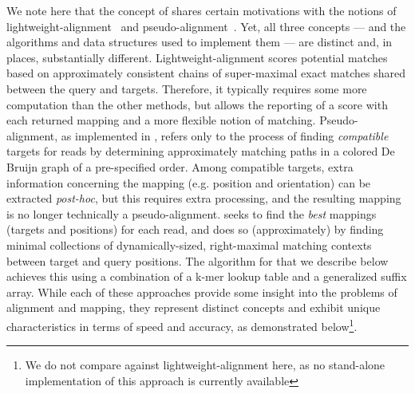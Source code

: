 We note here that the concept of \qm shares certain motivations with the notions of lightweight-alignment~\citep{salmon} and pseudo-alignment~\citep{kallisto}.  Yet, all three concepts --- and the algorithms and data structures used to implement them --- are distinct and, in places, substantially different.  Lightweight-alignment scores potential matches based on approximately consistent chains of super-maximal exact matches shared between the query and targets. Therefore, it typically requires some more computation than the other methods, but allows the reporting of a score with each returned mapping and a more flexible notion of matching.  Pseudo-alignment, as implemented in \kallisto, refers only to the process of finding \textit{compatible} targets for reads by determining approximately matching paths in a colored De Bruijn graph of a pre-specified order.  Among compatible targets, extra information concerning the mapping (e.g. position and orientation) can be extracted \textit{post-hoc}, but this requires extra processing, and the resulting mapping is no longer technically a pseudo-alignment.  \Qm seeks to find the \textit{best} mappings (targets and positions) for each read, and does so (approximately) by finding minimal collections of dynamically-sized, right-maximal matching contexts between target and query positions.  The algorithm for \qm that we describe below achieves this using a combination of a k-mer lookup table and a generalized suffix array.  While each of these approaches provide some insight into the problems of alignment and mapping, they represent distinct concepts and exhibit unique characteristics in terms of speed and accuracy, as demonstrated below\footnote{We do not compare against lightweight-alignment here, as no stand-alone implementation of this approach is currently available}.



\begin{figure*}
 \centering
 \texttt{[image: rapmap/\{Avi.RPE.fig.1]}.pdf}
  \caption{The transcriptome (consisting of transcripts $t_1,\ldots ,t_6$) is converted into a $\$$-separated string, $T$, upon which a suffix array, \SA{T}, and a hash table, $h$, are constructed. The mapping operation begins with a \kmer (here, $k=3$) mapping to an interval $\interval{b}{e}$ in \SA{T}.  Given this interval and the read, \MMP[i] and \NIP{\MMP[i]} are calculated as described in section \ref{sec:methods}. The search for the next hashable \kmer begins $k$ bases before \NIP{\MMP[i]}. }
  \label{fig:overview}
\end{figure*}

